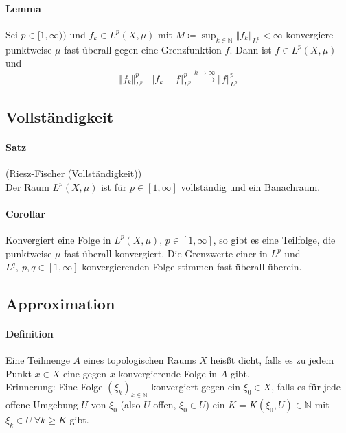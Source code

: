\documentclass[12pt,a4paper,fleqn]{article}
\begin{document}
\paragraph{Lemma} Sei $p \in [1, \infty))$ und $f_k \in {L}^p(X, \mu)$ mit $M \coloneqq \sup_{k \in \mathbb{N}} \Vert f_k \Vert_{L^p} < \infty$ konvergiere punktweise $\mu$-fast überall gegen eine Grenzfunktion $f$. Dann ist $f \in {L}^p(X, \mu)$ und 
\begin{displaymath}
\Vert f_k \Vert^p_{L^p} - \Vert f_k - f \Vert^p_{L^p} \xrightarrow{k \rightarrow \infty} \Vert f \Vert^p_{L^p}
\end{displaymath}

\subsection{Vollständigkeit}

\paragraph{Satz} (Riesz-Fischer (Vollständigkeit))\\
Der Raum ${L}^p(X, \mu)$ ist für $p \in [1, \infty]$ vollständig und ein Banachraum.

\paragraph{Corollar} Konvergiert eine Folge in ${L}^p(X, \mu)$, $p \in [1, \infty]$, so gibt es eine Teilfolge, die punktweise $\mu$-fast überall konvergiert. Die Grenzwerte einer in ${L}^p$ und \mbox{${L}^q,\ p, q \in [1, \infty]$} konvergierenden Folge stimmen fast überall überein.

\subsection{Approximation}

\paragraph{Definition} Eine Teilmenge $A$ eines topologischen Raums $X$ heisßt dicht, falls es zu jedem Punkt $x \in X$ eine gegen $x$ konvergierende Folge in $A$ gibt.\\
Erinnerung: Eine Folge $(\xi_k)_{k \in \mathbb{N}}$ konvergiert gegen ein $\xi_0 \in X$, falls es für jede offene Umgebung $U$ von $\xi_0$ (also $U$ offen, $\xi_0 \in U$) ein $K = K(\xi_0, U) \in \mathbb{N}$ mit $\xi_k \in U\ \forall k \geq K$ gibt.
\end{document}
